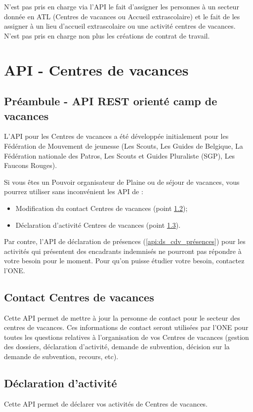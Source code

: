 N'est pas pris en charge via l'API le fait d'assigner les personnes à un secteur donnée en ATL (Centres de vacances ou Accueil extrascolaire) et le fait de les assigner à un lieu d'accueil extrascolaire ou une activité centres de vacances. 
N'est pas pris en charge non plus les créations de contrat de travail. 


\section{API - Centres de vacances}\label{api:cdv}
\subsection{Préambule - API REST orienté camp de vacances}
L'API pour les Centres de vacances a été développée initialement pour les Fédération de Mouvement de jeunesse (Les Scouts, Les Guides de Belgique, La Fédération nationale des Patros, Les Scouts et Guides Pluraliste (SGP), Les Faucons Rouges). 

Si vous êtes un Pouvoir organisateur de Plaine ou de séjour de vacances, vous pourrez utiliser sans inconvénient les API de :
\begin{itemize}
    \item Modification du contact Centres de vacances (point \ref{api:contact_cdv});
    \item Déclaration d'activité Centres de vacances (point \ref{api:da_cdv}). 
\end{itemize}

Par contre, l'API de déclaration de présences (\ref{api:ds_cdv_présences}) pour les activités qui présentent des encadrants indemnisés ne pourront pas répondre à votre besoin pour le moment. Pour qu'on puisse étudier votre besoin, contactez l'ONE. 


\subsection{Contact Centres de vacances}\label{api:contact_cdv}
Cette API permet de mettre à jour la personne de contact pour le secteur des centres de vacances. Ces informations de contact seront utilisées par l'ONE pour toutes les questions relatives à l'organisation de vos Centres de vacances (gestion des dossiers, déclaration d'activité, demande de subvention, décision sur la demande de subvention, recours, etc). 


\subsection{Déclaration d'activité}\label{api:da_cdv}
Cette API permet de déclarer vos activités de Centres de vacances. 

